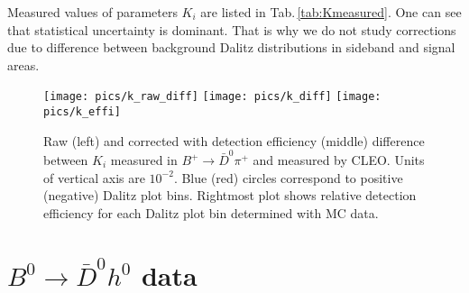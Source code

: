 \documentclass[preprint,aps,showpacs]{revtex4}
\newcommand{\bdh}{\ensuremath{B^0\to \bar D^0h^0}\xspace}
\newcommand{\bptodpi}{\ensuremath{B^{+}\to \bar D^0\pi^+}\xspace}
\begin{document}
Measured values of parameters $K_i$ are listed in Tab.\,\ref{tab:Kmeasured}. One can see that statistical uncertainty is dominant. That is why we do not study corrections due to difference between background Dalitz distributions in sideband and signal areas.

\begin{figure}[htb]
\texttt{[image: pics/k\_raw\_diff]}
\texttt{[image: pics/k\_diff]}
\texttt{[image: pics/k\_effi]}
\caption{Raw (left) and corrected with detection efficiency (middle) difference between $K_i$ measured in \bptodpi and measured by CLEO. Units of vertical axis are $10^{-2}$. Blue (red) circles correspond to positive (negative) Dalitz plot bins. Rightmost plot shows relative detection efficiency for each Dalitz plot bin determined with MC data.}
\label{fig:k_diff}
\end{figure}

\section{\bdh data}
\end{document}
